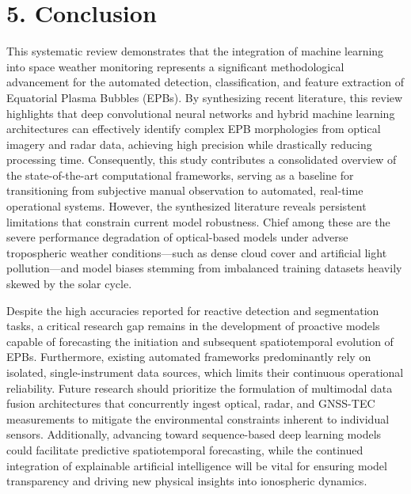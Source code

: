 \hypertarget{conclusion}{%
\section{5. Conclusion}\label{conclusion}}

This systematic review demonstrates that the integration of machine
learning into space weather monitoring represents a significant
methodological advancement for the automated detection, classification,
and feature extraction of Equatorial Plasma Bubbles (EPBs). By
synthesizing recent literature, this review highlights that deep
convolutional neural networks and hybrid machine learning architectures
can effectively identify complex EPB morphologies from optical imagery
and radar data, achieving high precision while drastically reducing
processing time. Consequently, this study contributes a consolidated
overview of the state-of-the-art computational frameworks, serving as a
baseline for transitioning from subjective manual observation to
automated, real-time operational systems. However, the synthesized
literature reveals persistent limitations that constrain current model
robustness. Chief among these are the severe performance degradation of
optical-based models under adverse tropospheric weather
conditions---such as dense cloud cover and artificial light
pollution---and model biases stemming from imbalanced training datasets
heavily skewed by the solar cycle.

Despite the high accuracies reported for reactive detection and
segmentation tasks, a critical research gap remains in the development
of proactive models capable of forecasting the initiation and subsequent
spatiotemporal evolution of EPBs. Furthermore, existing automated
frameworks predominantly rely on isolated, single-instrument data
sources, which limits their continuous operational reliability. Future
research should prioritize the formulation of multimodal data fusion
architectures that concurrently ingest optical, radar, and GNSS-TEC
measurements to mitigate the environmental constraints inherent to
individual sensors. Additionally, advancing toward sequence-based deep
learning models could facilitate predictive spatiotemporal forecasting,
while the continued integration of explainable artificial intelligence
will be vital for ensuring model transparency and driving new physical
insights into ionospheric dynamics.

